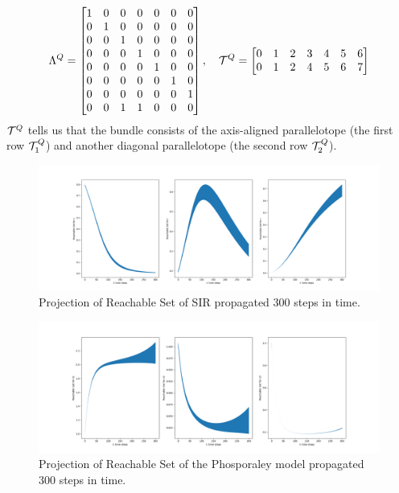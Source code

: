 \begin{example}
\begin{equation}
  \Lambda^Q = \begin{bmatrix}
            1 & 0 & 0 & 0 & 0 & 0 & 0 \\
            0 & 1 & 0 & 0 & 0 & 0 & 0 \\
            0 & 0 & 1 & 0 & 0 & 0 & 0 \\
            0 & 0 & 0 & 1 & 0 & 0 & 0 \\
            0 & 0 & 0 & 0 & 1 & 0 & 0 \\
            0 & 0 & 0 & 0 & 0 & 1 & 0 \\
            0 & 0 & 0 & 0 & 0 & 0 & 1 \\
            0 & 0 & 1 & 1 & 0 & 0 & 0 \\
            \end{bmatrix}, \quad
  \mathcal{T}^Q = \begin{bmatrix}
        0 & 1 & 2 & 3 & 4 & 5 & 6 \\
        0 & 1 & 2 & 4 & 5 & 6 & 7
        \end{bmatrix}
\end{equation}
$\mathcal{T}^Q$ tells us that the bundle consists of the axis-aligned parallelotope (the first row $\mathcal{T}^Q_1$) and another diagonal parallelotope (the second row $\mathcal{T}^Q_2$).
\end{example}

\def \reachplotwidth {1.3}

\begin{figure}[h!]
  \hspace*{-2.4cm}
  \includegraphics[width=\reachplotwidth\textwidth]{figures/SIRProj.png}
  \caption{Projection of Reachable Set of SIR propagated 300 steps in time.}
  \label{fig:kaa_sir}
\end{figure}

\begin{figure}[h!]
  \hspace*{-2.4cm}
  \includegraphics[width=\reachplotwidth\textwidth]{figures/PhosporlayProjOn X_1, X_2, X_3.png}
  \caption{Projection of Reachable Set of the Phosporaley model propagated 300 steps in time.}
  \label{fig:kaa_phos}
\end{figure}
